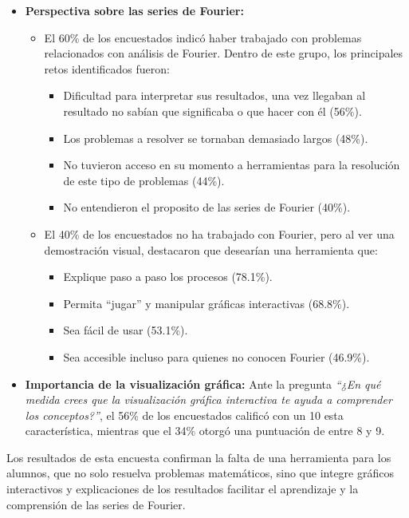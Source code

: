 \begin{itemize}
	\item \textbf{Perspectiva sobre las series de Fourier:}
	\begin{itemize}
		\item El 60\% de los encuestados indicó haber trabajado con problemas relacionados con análisis de Fourier. Dentro de este grupo, los principales retos identificados fueron:
		\begin{itemize}
			\item Dificultad para interpretar sus resultados, una vez llegaban al resultado no sabían que significaba o que hacer con él (56\%).
			\item Los problemas a resolver se tornaban demasiado largos (48\%).
			\item No tuvieron acceso en su momento a herramientas para la resolución de este tipo de problemas (44\%).
			\item No entendieron el proposito de las series de Fourier (40\%).
		\end{itemize}
		\item El 40\% de los encuestados no ha trabajado con Fourier, pero al ver una demostración visual, destacaron que desearían una herramienta que:
		\begin{itemize}
			\item Explique paso a paso los procesos (78.1\%).
			\item Permita ``jugar'' y manipular gráficas interactivas (68.8\%).
			\item Sea fácil de usar (53.1\%).
			\item Sea accesible incluso para quienes no conocen Fourier (46.9\%).
		\end{itemize}
	\end{itemize}
	
	\item \textbf{Importancia de la visualización gráfica:} Ante la pregunta \textit{“¿En qué medida crees que la visualización gráfica interactiva te ayuda a comprender los conceptos?”}, el 56\% de los encuestados calificó con un 10 esta característica, mientras que el 34\% otorgó una puntuación de entre 8 y 9.
\end{itemize}

Los resultados de esta encuesta confirman la falta de una herramienta para los alumnos, que no solo resuelva problemas matemáticos, sino que integre gráficos interactivos y explicaciones de los resultados facilitar el aprendizaje y la comprensión de las series de Fourier.

